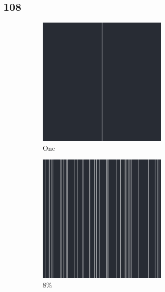 \documentclass[12pt, fleqn]{report}                             %
\theoremstyle{break}                                            %
\begin{document}
      \subsection{108}
        \begin{figure}[h!]
          \centering
          \begin{subfigure}[b]{0.4\linewidth}
            \includegraphics[width=0.7\textwidth]{Images/108/a.png}
            \caption{One}
          \end{subfigure}
          \begin{subfigure}[b]{0.4\linewidth}
            \includegraphics[width=0.7\textwidth]{Images/108/b.png}
            \caption{8\%}
          \end{subfigure}
          \begin{subfigure}[b]{0.4\linewidth}

\end{subfigure}
\end{figure}
\end{document}
